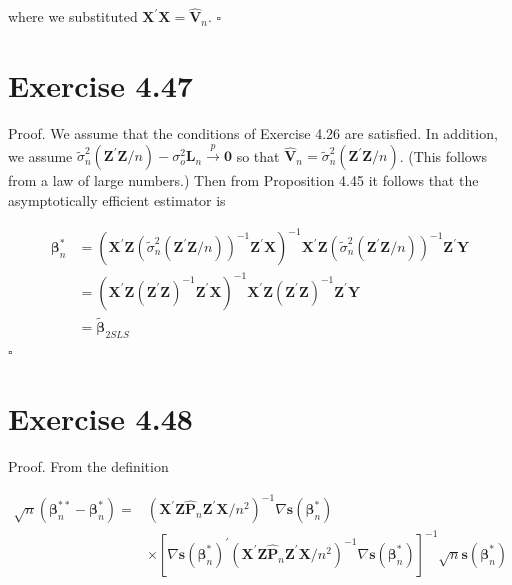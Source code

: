 \documentclass[10pt]{article}
\begin{document}
where we substituted $\mathbf{X}^{\prime} \mathbf{X}=\hat{\mathbf{V}}_{n}$. \(\square\)

\section*{Exercise 4.47}
Proof. We assume that the conditions of Exercise 4.26 are satisfied. In addition, we assume $\tilde{\sigma}_{n}^{2}\left(\mathbf{Z}^{\prime} \mathbf{Z} / n\right)-\sigma_{o}^{2} \mathbf{L}_{n} \xrightarrow{p} \mathbf{0}$ so that $\hat{\mathbf{V}}_{n}=\tilde{\sigma}_{n}^{2}\left(\mathbf{Z}^{\prime} \mathbf{Z} / n\right)$. (This follows from a law of large numbers.) Then from Proposition 4.45 it follows that the asymptotically efficient estimator is

$$
\begin{aligned}
\boldsymbol{\beta}_{n}^{*} & =\left(\mathbf{X}^{\prime} \mathbf{Z}\left(\tilde{\sigma}_{n}^{2}\left(\mathbf{Z}^{\prime} \mathbf{Z} / n\right)\right)^{-1} \mathbf{Z}^{\prime} \mathbf{X}\right)^{-1} \mathbf{X}^{\prime} \mathbf{Z}\left(\tilde{\sigma}_{n}^{2}\left(\mathbf{Z}^{\prime} \mathbf{Z} / n\right)\right)^{-1} \mathbf{Z}^{\prime} \mathbf{Y} \\
& =\left(\mathbf{X}^{\prime} \mathbf{Z}\left(\mathbf{Z}^{\prime} \mathbf{Z}\right)^{-1} \mathbf{Z}^{\prime} \mathbf{X}\right)^{-1} \mathbf{X}^{\prime} \mathbf{Z}\left(\mathbf{Z}^{\prime} \mathbf{Z}\right)^{-1} \mathbf{Z}^{\prime} \mathbf{Y} \\
& =\tilde{\boldsymbol{\beta}}_{2 S L S}
\end{aligned}
$$ \(\square\)

\section*{Exercise 4.48}
Proof. From the definition

$$
\begin{aligned}
\sqrt{n}\left(\boldsymbol{\beta}_{n}^{* *}-\boldsymbol{\beta}_{n}^{*}\right)= & \left(\mathbf{X}^{\prime} \mathbf{Z} \hat{\mathbf{P}}_{n} \mathbf{Z}^{\prime} \mathbf{X} / n^{2}\right)^{-1} \nabla \mathbf{s}\left(\boldsymbol{\beta}_{n}^{*}\right) \\
& \times\left[\nabla \mathbf{s}\left(\boldsymbol{\beta}_{n}^{*}\right)^{\prime}\left(\mathbf{X}^{\prime} \mathbf{Z} \hat{\mathbf{P}}_{n} \mathbf{Z}^{\prime} \mathbf{X} / n^{2}\right)^{-1} \nabla \mathbf{s}\left(\boldsymbol{\beta}_{n}^{*}\right)\right]^{-1} \sqrt{n} \mathbf{s}\left(\boldsymbol{\beta}_{n}^{*}\right)
\end{aligned}
$$
\end{document}
